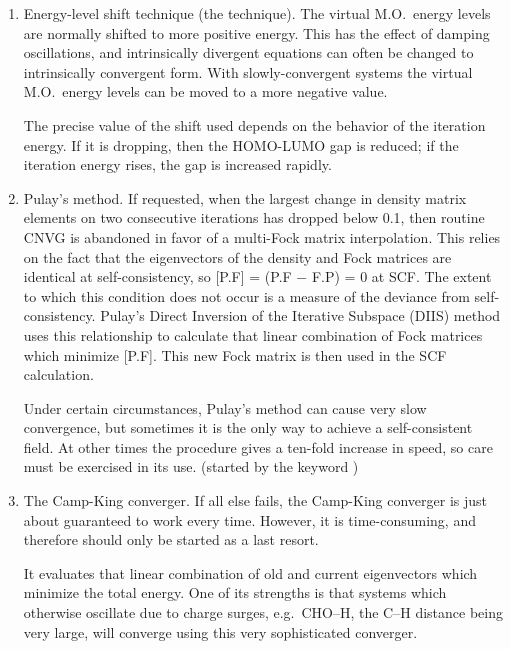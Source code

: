 \begin{enumerate}
\item Energy-level shift technique (the  technique).  The  virtual
M.O.\  energy  levels are  normally  shifted  to more positive energy.  This
has the effect of damping oscillations, and intrinsically divergent equations
can often be changed   to  intrinsically  convergent  form.   With 
slowly-convergent systems the virtual M.O.\  energy levels can be moved to a
more  negative value.

The precise value of the shift used depends on the behavior of  the iteration
energy.  If it is dropping, then the HOMO-LUMO gap is reduced; if the iteration
energy rises, the gap is increased rapidly.

\item Pulay's method.  If  requested,  when  the  largest  change  in density 
matrix elements on two consecutive iterations has dropped below 
0.1, then routine CNVG is abandoned in  favor  of  a  multi-Fock  matrix
interpolation.   This  relies  on  the fact that the eigenvectors of the
density and Fock matrices are identical at self-consistency, so  [P.F] =  (P.F
$-$ F.P) = 0 at  SCF.  The extent to which this condition does not occur is a
measure of  the  deviance  from  self-consistency.   Pulay's  Direct Inversion
of the Iterative Subspace (DIIS) method  uses  this relationship to calculate
that linear combination of Fock matrices which minimize  [P.F].   This  new 
Fock  matrix  is  then  used  in  the  SCF calculation.

Under certain circumstances, Pulay's method  can  cause  very  slow
convergence,   but   sometimes   it   is  the  only  way  to  achieve  a
self-consistent field.  At other times the procedure  gives  a  ten-fold
increase  in  speed,  so care must be exercised in its use.  (started by the
keyword )

\item The Camp-King converger.  If  all  else  fails,  the  Camp-King
 converger  is  just about guaranteed to work every
time.  However, it is time-consuming, and therefore should only be started as a
last resort.

It  evaluates  that  linear  combination   of   old   and   current
eigenvectors  which  minimize the total energy.  One of its strengths is that
systems which  otherwise  oscillate  due  to  charge  surges,  e.g.\ CHO--H, 
the C--H distance being very large, will converge using this very sophisticated
converger.
\end{enumerate}

